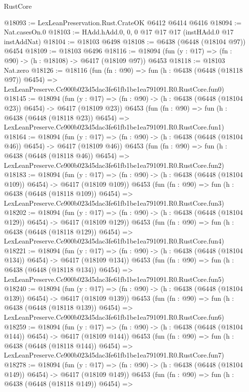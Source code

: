 \begin{lexlean}{RustCore}
\begin{coremodule}
@18093 := LexLeanPreservation.Rust.CrateOK @6412 @6414 @6416
@18094 := Nat.casesOn.{0}
@18103 := HAdd.hAdd.{0, 0, 0} @17 @17 @17 (instHAdd.{0} @17 instAddNat)
@18104 := @18103 @6498
@18108 := @6438 (@6448 (@18104 @97)) @6454
@18109 := @18103 @6496
@18116 := @18094 (fun (y : @17) => (fn : @90) -> (h : @18108) -> @6417 (@18109 @97)) @6453
@18118 := @18103 Nat.zero
@18126 := @18116
    (fun (fn : @90) =>
    fun (h : @6438 (@6448 (@18118 @97)) @6454) =>
    LexLeanPreserve.Ce900b023d5dac3fe61fb1be1ea791091.R0.RustCore.fun0)
@18145 := @18094
    (fun (y : @17) => (fn : @90) -> (h : @6438 (@6448 (@18104 @23)) @6454) -> @6417 (@18109 @23))
    @6453
    (fun (fn : @90) =>
    fun (h : @6438 (@6448 (@18118 @23)) @6454) =>
    LexLeanPreserve.Ce900b023d5dac3fe61fb1be1ea791091.R0.RustCore.fun1)
@18164 := @18094
    (fun (y : @17) => (fn : @90) -> (h : @6438 (@6448 (@18104 @46)) @6454) -> @6417 (@18109 @46))
    @6453
    (fun (fn : @90) =>
    fun (h : @6438 (@6448 (@18118 @46)) @6454) =>
    LexLeanPreserve.Ce900b023d5dac3fe61fb1be1ea791091.R0.RustCore.fun2)
@18183 := @18094
    (fun (y : @17) => (fn : @90) -> (h : @6438 (@6448 (@18104 @109)) @6454) -> @6417 (@18109 @109))
    @6453
    (fun (fn : @90) =>
    fun (h : @6438 (@6448 (@18118 @109)) @6454) =>
    LexLeanPreserve.Ce900b023d5dac3fe61fb1be1ea791091.R0.RustCore.fun3)
@18202 := @18094
    (fun (y : @17) => (fn : @90) -> (h : @6438 (@6448 (@18104 @129)) @6454) -> @6417 (@18109 @129))
    @6453
    (fun (fn : @90) =>
    fun (h : @6438 (@6448 (@18118 @129)) @6454) =>
    LexLeanPreserve.Ce900b023d5dac3fe61fb1be1ea791091.R0.RustCore.fun4)
@18221 := @18094
    (fun (y : @17) => (fn : @90) -> (h : @6438 (@6448 (@18104 @134)) @6454) -> @6417 (@18109 @134))
    @6453
    (fun (fn : @90) =>
    fun (h : @6438 (@6448 (@18118 @134)) @6454) =>
    LexLeanPreserve.Ce900b023d5dac3fe61fb1be1ea791091.R0.RustCore.fun5)
@18240 := @18094
    (fun (y : @17) => (fn : @90) -> (h : @6438 (@6448 (@18104 @139)) @6454) -> @6417 (@18109 @139))
    @6453
    (fun (fn : @90) =>
    fun (h : @6438 (@6448 (@18118 @139)) @6454) =>
    LexLeanPreserve.Ce900b023d5dac3fe61fb1be1ea791091.R0.RustCore.fun6)
@18259 := @18094
    (fun (y : @17) => (fn : @90) -> (h : @6438 (@6448 (@18104 @144)) @6454) -> @6417 (@18109 @144))
    @6453
    (fun (fn : @90) =>
    fun (h : @6438 (@6448 (@18118 @144)) @6454) =>
    LexLeanPreserve.Ce900b023d5dac3fe61fb1be1ea791091.R0.RustCore.fun7)
@18278 := @18094
    (fun (y : @17) => (fn : @90) -> (h : @6438 (@6448 (@18104 @149)) @6454) -> @6417 (@18109 @149))
    @6453
    (fun (fn : @90) =>
    fun (h : @6438 (@6448 (@18118 @149)) @6454) =>

\end{coremodule}
\end{lexlean}
